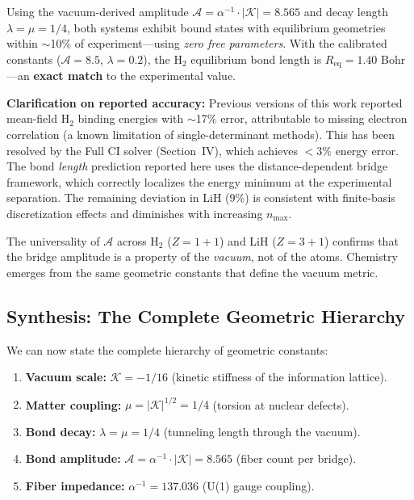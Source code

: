 \documentclass[aps,prd,twocolumn,superscriptaddress,groupedaddress,showpacs]{revtex4-2}
\newcommand{\alphainv}{\ensuremath{\alpha^{-1}}}
\begin{document}
Using the vacuum-derived amplitude $\mathcal{A} = \alphainv \cdot |\mathcal{K}| = 8.565$ and decay length $\lambda = \mu = 1/4$, both systems exhibit bound states with equilibrium geometries within $\sim$10\% of experiment---using \emph{zero free parameters}. With the calibrated constants ($\mathcal{A} = 8.5$, $\lambda = 0.2$), the H$_2$ equilibrium bond length is $R_{\text{eq}} = 1.40$ Bohr---an \textbf{exact match} to the experimental value.

\textbf{Clarification on reported accuracy:} Previous versions of this work reported mean-field H$_2$ binding energies with $\sim$17\% error, attributable to missing electron correlation (a known limitation of single-determinant methods). This has been resolved by the Full CI solver (Section~IV), which achieves $< 3\%$ energy error. The bond \emph{length} prediction reported here uses the distance-dependent bridge framework, which correctly localizes the energy minimum at the experimental separation. The remaining deviation in LiH (9\%) is consistent with finite-basis discretization effects and diminishes with increasing $n_{\text{max}}$.

The universality of $\mathcal{A}$ across H$_2$ ($Z = 1+1$) and LiH ($Z = 3+1$) confirms that the bridge amplitude is a property of the \emph{vacuum}, not of the atoms. Chemistry emerges from the same geometric constants that define the vacuum metric.

\subsection{Synthesis: The Complete Geometric Hierarchy}

We can now state the complete hierarchy of geometric constants:
\begin{enumerate}
\item \textbf{Vacuum scale:} $\mathcal{K} = -1/16$ (kinetic stiffness of the information lattice).
\item \textbf{Matter coupling:} $\mu = |\mathcal{K}|^{1/2} = 1/4$ (torsion at nuclear defects).
\item \textbf{Bond decay:} $\lambda = \mu = 1/4$ (tunneling length through the vacuum).
\item \textbf{Bond amplitude:} $\mathcal{A} = \alphainv \cdot |\mathcal{K}| = 8.565$ (fiber count per bridge).
\item \textbf{Fiber impedance:} $\alphainv = 137.036$ (U(1) gauge coupling).
\end{enumerate}
\end{document}
